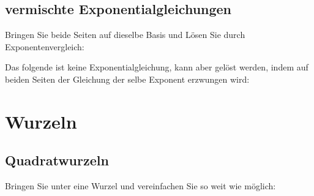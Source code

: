 \newpage
\subsection{vermischte Exponentialgleichungen}
Bringen Sie beide Seiten auf dieselbe Basis und Lösen Sie durch
Exponentenvergleich:


\noTRAINER{\newpage}


Das folgende ist keine Exponentialgleichung, kann aber gelöst werden,
indem auf beiden Seiten der Gleichung der selbe Exponent erzwungen
wird:


\newpage
\section{Wurzeln}
\subsection{Quadratwurzeln}



\noTRAINER{\newpage}



Bringen Sie unter eine Wurzel und vereinfachen Sie so weit wie
möglich:



\noTRAINER{\newpage}


\noTRAINER{\newpage}


